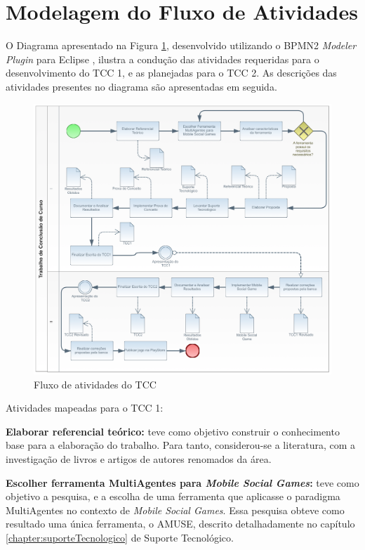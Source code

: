 \section{Modelagem do Fluxo de Atividades}
\label{sec:modelagem}

O Diagrama apresentado na Figura \ref{figura:diagram}, desenvolvido utilizando
o BPMN2 \textit{Modeler Plugin} para Eclipse \cite{eclipse}, ilustra a condução
das atividades requeridas para o desenvolvimento do TCC 1, e as planejadas para
o TCC 2. As descrições das atividades presentes no diagrama são apresentadas em
seguida.


\begin{figure}[H]
  \centering
  \includegraphics[width=16cm]{figuras/diagram2}
  \caption{Fluxo de atividades do TCC}
  \label{figura:diagram}
\end{figure}

Atividades mapeadas para o TCC 1:

\textbf{Elaborar referencial teórico:} teve como objetivo construir o
conhecimento base para a elaboração do trabalho. Para tanto, considerou-se a
literatura, com a investigação de livros e artigos de autores renomados da área.

\textbf{Escolher ferramenta MultiAgentes para \textit{Mobile Social Games}:}
teve como objetivo a pesquisa, e a escolha de uma ferramenta que aplicasse o
paradigma MultiAgentes no contexto de \textit{Mobile Social Games}. Essa
pesquisa obteve como resultado uma única ferramenta, o AMUSE, descrito
detalhadamente no capítulo \ref{chapter:suporteTecnologico} de Suporte
Tecnológico.

